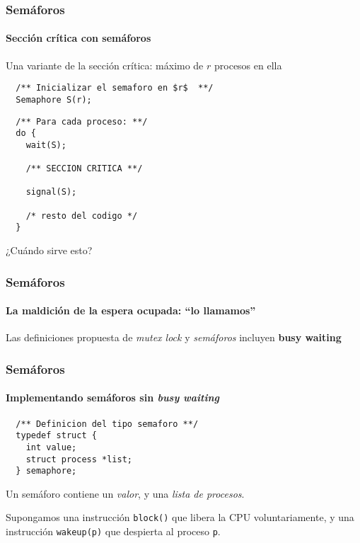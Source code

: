 \documentclass[letter]{beamer}
\begin{document}
\begin{frame}[fragile]
  \frametitle{Semáforos}
  \framesubtitle{Sección crítica con semáforos}

  Una variante de la sección crítica: máximo de $r$ procesos en ella

\begin{verbatim}
  /** Inicializar el semaforo en $r$  **/
  Semaphore S(r);
\end{verbatim}

\begin{verbatim}
  /** Para cada proceso: **/
  do {
    wait(S);
    
    /** SECCION CRITICA **/
    
    signal(S);
    
    /* resto del codigo */
  }
\end{verbatim}

¿Cuándo sirve esto?

\end{frame}

\begin{frame}
  \frametitle{Semáforos}
  \framesubtitle{La maldición de la espera ocupada: ``lo llamamos''}

  Las definiciones propuesta de {\em mutex lock} y {\em semáforos} incluyen {\bf busy waiting}
  
  

\end{frame}

\begin{frame}[fragile]
  \frametitle{Semáforos}
  \framesubtitle{Implementando semáforos sin {\em busy waiting}}

\begin{verbatim}
  /** Definicion del tipo semaforo **/
  typedef struct {
    int value;
    struct process *list;
  } semaphore;
\end{verbatim}

Un semáforo contiene un {\em valor}, y una {\em lista de procesos}.

Supongamos una instrucción {\tt block()} que libera la CPU voluntariamente,
y una instrucción {\tt wakeup(p)} que despierta al proceso {\tt p}.

\end{frame}
\end{document}
